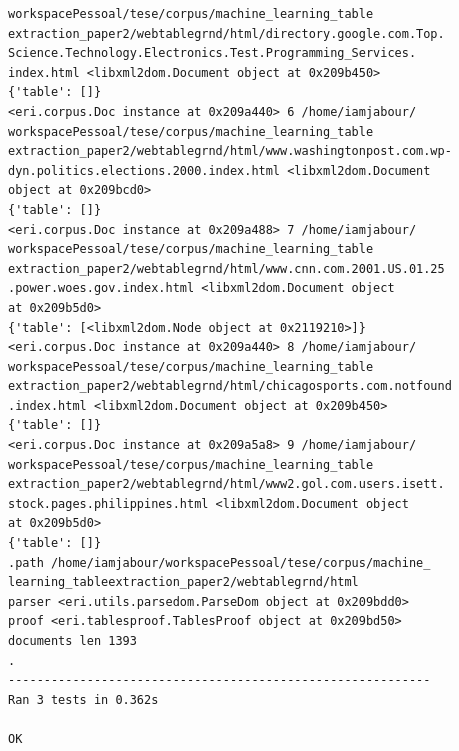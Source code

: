 \documentclass[12pt, a4paper]{article}
\begin{document}
\begin{enumerate}
\begin{verbatim}
workspacePessoal/tese/corpus/machine_learning_table
extraction_paper2/webtablegrnd/html/directory.google.com.Top.
Science.Technology.Electronics.Test.Programming_Services.
index.html <libxml2dom.Document object at 0x209b450>
{'table': []}
<eri.corpus.Doc instance at 0x209a440> 6 /home/iamjabour/
workspacePessoal/tese/corpus/machine_learning_table
extraction_paper2/webtablegrnd/html/www.washingtonpost.com.wp-
dyn.politics.elections.2000.index.html <libxml2dom.Document 
object at 0x209bcd0>
{'table': []}
<eri.corpus.Doc instance at 0x209a488> 7 /home/iamjabour/
workspacePessoal/tese/corpus/machine_learning_table
extraction_paper2/webtablegrnd/html/www.cnn.com.2001.US.01.25
.power.woes.gov.index.html <libxml2dom.Document object 
at 0x209b5d0>
{'table': [<libxml2dom.Node object at 0x2119210>]}
<eri.corpus.Doc instance at 0x209a440> 8 /home/iamjabour/
workspacePessoal/tese/corpus/machine_learning_table
extraction_paper2/webtablegrnd/html/chicagosports.com.notfound
.index.html <libxml2dom.Document object at 0x209b450>
{'table': []}
<eri.corpus.Doc instance at 0x209a5a8> 9 /home/iamjabour/
workspacePessoal/tese/corpus/machine_learning_table
extraction_paper2/webtablegrnd/html/www2.gol.com.users.isett.
stock.pages.philippines.html <libxml2dom.Document object 
at 0x209b5d0>
{'table': []}
.path /home/iamjabour/workspacePessoal/tese/corpus/machine_
learning_tableextraction_paper2/webtablegrnd/html
parser <eri.utils.parsedom.ParseDom object at 0x209bdd0>
proof <eri.tablesproof.TablesProof object at 0x209bd50>
documents len 1393
.
-----------------------------------------------------------
Ran 3 tests in 0.362s

OK
\end{verbatim}
\end{enumerate}



\end{document}
